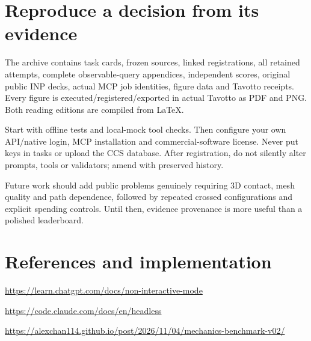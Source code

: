 \documentclass[11pt,a4paper]{ctexart}
\begin{document}
\section{Reproduce a decision from its evidence}

The archive contains task cards, frozen sources, linked registrations, all retained attempts, complete observable-query appendices, independent scores, original public INP decks, actual MCP job identities, figure data and Tavotto receipts. Every figure is executed/registered/exported in actual Tavotto as PDF and PNG. Both reading editions are compiled from LaTeX.

\par

Start with offline tests and local-mock tool checks. Then configure your own API/native login, MCP installation and commercial-software license. Never put keys in tasks or upload the CCS database. After registration, do not silently alter prompts, tools or validators; amend with preserved history.

\par

Future work should add public problems genuinely requiring 3D contact, mesh quality and path dependence, followed by repeated crossed configurations and explicit spending controls. Until then, evidence provenance is more useful than a polished leaderboard.

\par

\section{References and implementation}

\url{https://learn.chatgpt.com/docs/non-interactive-mode}\par

\url{https://code.claude.com/docs/en/headless}\par

\url{https://alexchan114.github.io/post/2026/11/04/mechanics-benchmark-v02/}\par
\end{document}
